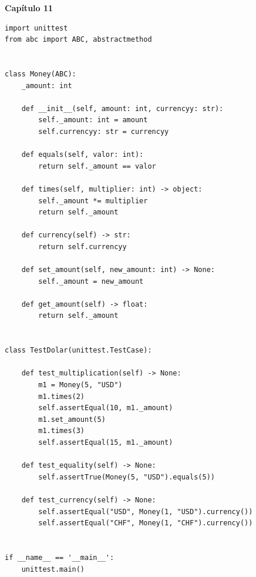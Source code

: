\documentclass[a4paper,12pt]{article}
\newcommand{\capitulo}[1]{
    \vspace{1em}
    \noindent
    \colorbox{black!15}{
        \parbox{\dimexpr\linewidth-2\fboxsep}{
            \centering \Large \textbf{#1}
        }
    }
    \vspace{1em}
}
\begin{document}
\capitulo{Capítulo 11}
\begin{lstlisting}[style=pythonstyle]
import unittest
from abc import ABC, abstractmethod


class Money(ABC):
    _amount: int

    def __init__(self, amount: int, currencyy: str):
        self._amount: int = amount
        self.currencyy: str = currencyy 

    def equals(self, valor: int):
        return self._amount == valor 

    def times(self, multiplier: int) -> object:
        self._amount *= multiplier
        return self._amount

    def currency(self) -> str:
        return self.currencyy

    def set_amount(self, new_amount: int) -> None:
        self._amount = new_amount

    def get_amount(self) -> float:
        return self._amount


class TestDolar(unittest.TestCase):

    def test_multiplication(self) -> None:
        m1 = Money(5, "USD")
        m1.times(2) 
        self.assertEqual(10, m1._amount)
        m1.set_amount(5)
        m1.times(3) 
        self.assertEqual(15, m1._amount)

    def test_equality(self) -> None:
        self.assertTrue(Money(5, "USD").equals(5))

    def test_currency(self) -> None:
        self.assertEqual("USD", Money(1, "USD").currency())
        self.assertEqual("CHF", Money(1, "CHF").currency())


if __name__ == '__main__':
    unittest.main()
\end{lstlisting}
\end{document}
